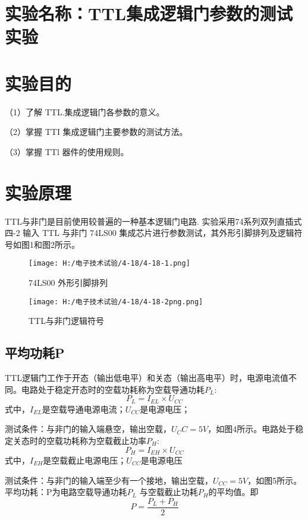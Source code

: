 \documentclass{article}
\begin{document}
	\section{ 实验名称：TTL集成逻辑门参数的测试实验}
    \section{ 实验目的}
     （1）了解 TTL.集成逻辑门各参数的意义。\par
               （2）掌握 TTI 集成逻辑门主要参数的测试方法。\par
               （3）掌握 TTl 器件的使用规则。\par

   	\section{ 实验原理}
              
 TTL与非门是目前使用较普遍的一种基本逻辑门电路.
    实验采用74系列双列直插式四-2 输入 TTL 与非门 74LS00 集成芯片进行参数测试，其外形引脚排列及逻辑符号如图1和图2所示。
	\begin{figure}[h]
        \begin{minipage}[t]{0.5\linewidth} %
          \centering   
          \texttt{[image: H:/电子技术试验/4-18/4-18-1.png]}   
          \caption{74LS00 外形引脚排列}   
          \label{fig:side:a}   
        \end{minipage}%
        \begin{minipage}[t]{0.5\linewidth}   
          \centering   
          \texttt{[image: H:/电子技术试验/4-18/4-18-2png.png]}   
          \caption{TTL与非门逻辑符号}   
          \label{fig:side:b}   
        \end{minipage}   
      \end{figure}
               \subsection{平均功耗P}
               TTL逻辑门工作于开态（输出低电平）和关态（输出高电平）时，电源电流值不同。电路处于稳定开态时的空载功耗称为空载导通功耗$P_L$:
             \[P_L=I_{EL}\times U_{CC}\]
               式中，$I_{EL}$是空载导通电源电流；$U_{CC}$是电源电压；\par 
               测试条件：与非门的输入端悬空，输出空载，$U_CC=5V$，如图4所示。电路处于稳定关态时的空载功耗称为空载截止功率$P_H$:
               \[P_H=I_{EH}\times U_{CC}\]
            式中，$I_{EH}$是空载截止电源电压；$U_{CC}$是电源电压\par
            测试条件：与非门的输入端至少有一个接地，输出空载，$U_{CC}=5V$，如图5所示。
            平均功耗：P为电路空载导通功耗$ P_L$ 与空载截止功耗$ P_H$的平均值。即\[P=\frac{P_L+P_H}{2}\]
\end{document}
